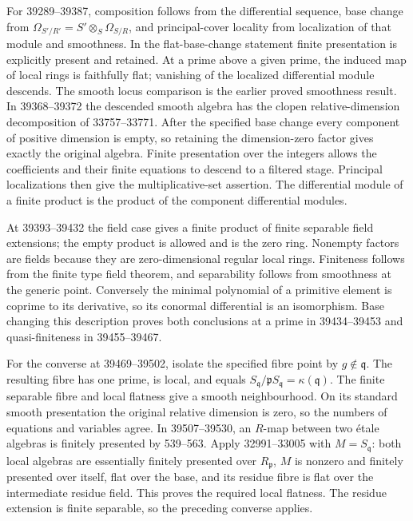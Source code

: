 For 39289--39387, composition follows from the differential sequence, base change from \(\Omega_{S'/R'}=S'\otimes_S\Omega_{S/R}\), and principal-cover locality from localization of that module and smoothness. In the flat-base-change statement finite presentation is explicitly present and retained. At a prime above a given prime, the induced map of local rings is faithfully flat; vanishing of the localized differential module descends. The smooth locus comparison is the earlier proved smoothness result. In 39368--39372 the descended smooth algebra has the clopen relative-dimension decomposition of 33757--33771. After the specified base change every component of positive dimension is empty, so retaining the dimension-zero factor gives exactly the original algebra. Finite presentation over the integers allows the coefficients and their finite equations to descend to a filtered stage. Principal localizations then give the multiplicative-set assertion. The differential module of a finite product is the product of the component differential modules.

At 39393--39432 the field case gives a finite product of finite separable field extensions; the empty product is allowed and is the zero ring. Nonempty factors are fields because they are zero-dimensional regular local rings. Finiteness follows from the finite type field theorem, and separability follows from smoothness at the generic point. Conversely the minimal polynomial of a primitive element is coprime to its derivative, so its conormal differential is an isomorphism. Base changing this description proves both conclusions at a prime in 39434--39453 and quasi-finiteness in 39455--39467.

For the converse at 39469--39502, isolate the specified fibre point by \(g\notin\mathfrak q\). The resulting fibre has one prime, is local, and equals \(S_{\mathfrak q}/\mathfrak pS_{\mathfrak q}=\kappa(\mathfrak q)\). The finite separable fibre and local flatness give a smooth neighbourhood. On its standard smooth presentation the original relative dimension is zero, so the numbers of equations and variables agree. In 39507--39530, an \(R\)-map between two étale algebras is finitely presented by 539--563. Apply 32991--33005 with \(M=S_{\mathfrak q}\): both local algebras are essentially finitely presented over \(R_{\mathfrak p}\), \(M\) is nonzero and finitely presented over itself, flat over the base, and its residue fibre is flat over the intermediate residue field. This proves the required local flatness. The residue extension is finite separable, so the preceding converse applies.

